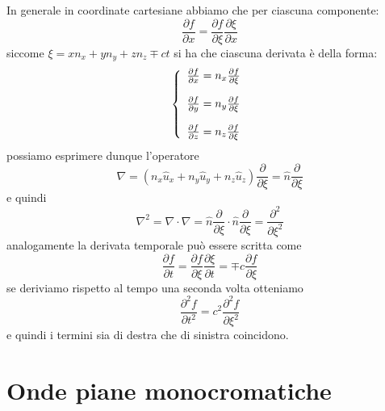 In generale in coordinate cartesiane abbiamo che per ciascuna componente:
\begin{equation*}
	\frac{\partial f}{\partial x} = \frac{\partial f}{\partial \xi} \frac{\partial \xi}{\partial x}
\end{equation*}
siccome $\xi = xn_{x} + yn_{y} + zn_{z} \mp ct $ si ha che ciascuna derivata \`e della forma:
\begin{equation*}
	\left \{ \begin{array}{l}
		\frac{\partial f}{\partial x} = n_{x} \frac{\partial f}{\partial \xi} \\ \rule{0pt}{20pt}
		\frac{\partial f}{\partial y} = n_{y} \frac{\partial f}{\partial \xi} \\ \rule{0pt}{20pt}
		\frac{\partial f}{\partial z} = n_{z} \frac{\partial f}{\partial \xi}
	\end{array}\right.
\end{equation*}
possiamo esprimere dunque l'operatore
\begin{equation*}
	\nabla = (n_{x} \hat{u}_{x} + n_{y} \hat{u}_{y} + n_{z} \hat{u}_{z}) \frac{\partial }{\partial \xi} = \hat{n} \frac{\partial }{\partial \xi} 
\end{equation*}
e quindi
\begin{equation*}
	\nabla^2 = \nabla \cdot \nabla = \hat{n} \frac{\partial }{\partial \xi} \cdot \hat{n} \frac{\partial }{\partial \xi} = \frac{\partial^2}{\partial \xi^2}
\end{equation*}
analogamente la derivata temporale pu\`o essere scritta come
\begin{equation*}
	\frac{\partial f}{\partial t} = \frac{\partial f }{\partial \xi} \frac{\partial \xi}{\partial t} = \mp c \frac{\partial f}{\partial \xi}
\end{equation*}
se deriviamo rispetto al tempo una seconda volta otteniamo
\begin{equation*}
	\frac{\partial^2 f }{\partial t^2} = c^2 \frac{\partial ^2f}{\partial \xi ^2}
\end{equation*}
e quindi i termini sia di destra che di sinistra coincidono.

\section{Onde piane monocromatiche}

